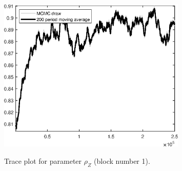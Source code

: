 \begin{figure}[H]
\centering
  \includegraphics[width=0.8\textwidth]{BRS_extended_fd/graphs/TracePlot_rho_Z_blck_1}\\
    \caption{Trace plot for parameter ${\rho_Z}$ (block number 1).}
\end{figure}
